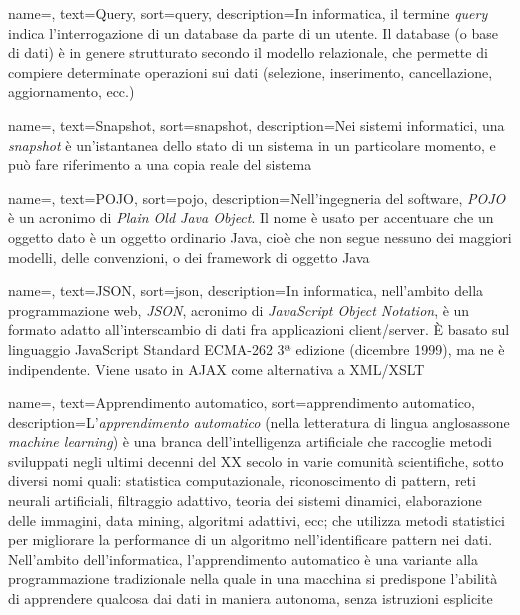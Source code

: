 {
    name=,
    text=Query,
    sort=query,
    description={In informatica, il termine \textit{query} indica l'interrogazione di un database da parte di un utente. Il database (o base di dati) è in genere strutturato secondo il modello relazionale, che permette di compiere determinate operazioni sui dati (selezione, inserimento, cancellazione, aggiornamento, ecc.)}
}

{
    name=,
    text=Snapshot,
    sort=snapshot,
    description={Nei sistemi informatici, una \textit{snapshot} è un'istantanea dello stato di un sistema in un particolare momento, e può fare riferimento a una copia reale del sistema}
}

{
    name=,
    text=POJO,
    sort=pojo,
    description={Nell'ingegneria del software, \textit{POJO} è un acronimo di \textit{Plain Old Java Object}. Il nome è usato per accentuare che un oggetto dato è un oggetto ordinario Java, cioè che non segue nessuno dei maggiori modelli, delle convenzioni, o dei \gls{framework} di oggetto Java}
}

{
    name=,
    text=JSON,
    sort=json,
    description={In informatica, nell'ambito della programmazione web, \textit{JSON}, acronimo di \textit{JavaScript Object Notation}, è un formato adatto all'interscambio di dati fra applicazioni client/server.
È basato sul linguaggio JavaScript Standard ECMA-262 3ª edizione (dicembre 1999), ma ne è indipendente. Viene usato in AJAX come alternativa a XML/XSLT
}
}

{
    name=,
    text=Apprendimento automatico,
    sort=apprendimento automatico,
    description={L'\textit{apprendimento automatico} (nella letteratura di lingua anglosassone \textit{machine learning}) è una branca dell'intelligenza artificiale che raccoglie metodi sviluppati negli ultimi decenni del XX secolo in varie comunità scientifiche, sotto diversi nomi quali: statistica computazionale, riconoscimento di pattern, reti neurali artificiali, filtraggio adattivo, teoria dei sistemi dinamici, elaborazione delle immagini, data mining, algoritmi adattivi, ecc; che utilizza metodi statistici per migliorare la performance di un algoritmo nell'identificare pattern nei dati. Nell'ambito dell'informatica, l'apprendimento automatico è una variante alla programmazione tradizionale nella quale in una macchina si predispone l'abilità di apprendere qualcosa dai dati in maniera autonoma, senza istruzioni esplicite}
}

